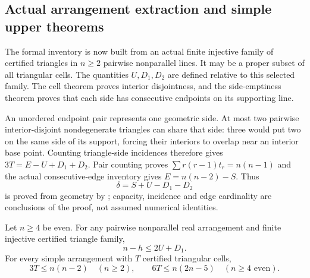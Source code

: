 \subsection{Actual arrangement extraction and simple upper theorems}
\label{upper:simple-actual}

The formal inventory is now built from an actual finite injective family
of certified triangles in $n\ge2$ pairwise nonparallel lines. It may
be a proper subset of all triangular cells. The quantities $U,D_1,D_2$
are defined relative to this selected family. The cell theorem proves
interior disjointness, and the side-emptiness theorem proves that each
side has consecutive endpoints on its supporting line.

An unordered endpoint pair represents one geometric side. At most two
pairwise interior-disjoint nondegenerate triangles can share that side:
three would put two on the same side of its support, forcing their
interiors to overlap near an interior base point. Counting triangle-side
incidences therefore gives $3T=E-U+D_1+D_2$. Pair counting proves
$\sum r(r-1)t_r=n(n-1)$ and the actual consecutive-edge inventory gives
$E=n(n-2)-S$. Thus
\begin{equation}
 \delta=S+U-D_1-D_2
 \label{upper:actual-identity}
\end{equation}
is proved from geometry by
;
capacity, incidence and edge cardinality are conclusions of the proof,
not assumed numerical identities.

\begin{theorem}
\label{upper:actual-simple}
Let $n\ge4$ be even. For any pairwise nonparallel real arrangement and
finite injective certified triangle family,
\begin{equation}
 n-h\le2U+D_1.
 \label{upper:actual-charging}
\end{equation}
For every simple arrangement with $T$ certified triangular cells,
\begin{equation}
 3T\le n(n-2)\quad(n\ge2),\qquad
 6T\le n(2n-5)\quad(n\ge4\text{ even}).
 \label{upper:actual-simple-bounds}
\end{equation}
\end{theorem}

